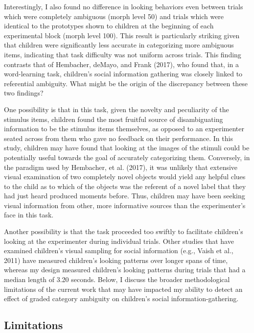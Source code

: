 \documentclass[floatsintext,man]{apa6}
\theoremstyle{definition}
\theoremstyle{definition}
\theoremstyle{definition}
\theoremstyle{remark}
\begin{document}
Interestingly, I also found no difference in looking behaviors even
between trials which were completely ambiguous (morph level 50) and
trials which were identical to the prototypes shown to children at the
beginning of each experimental block (morph level 100). This result is
particularly striking given that children were significantly less
accurate in categorizing more ambiguous items, indicating that task
difficulty was not uniform across trials. This finding contrasts that of
Hembacher, deMayo, and Frank (2017), who found that, in a word-learning
task, children's social information gathering was closely linked to
referential ambiguity. What might be the origin of the discrepancy
between these two findings?

One possibility is that in this task, given the novelty and peculiarity
of the stimulus items, children found the most fruitful source of
disambiguating information to be the stimulus items themselves, as
opposed to an experimenter seated across from them who gave no feedback
on their performance. In this study, children may have found that
looking at the images of the stimuli could be potentially useful towards
the goal of accurately categorizing them. Conversely, in the paradigm
used by Hembacher, et al. (2017), it was unlikely that extensive visual
examination of two completely novel objects would yield any helpful
clues to the child as to which of the objects was the referent of a
novel label that they had just heard produced moments before. Thus,
children may have been seeking visual information from other, more
informative sources than the experimenter's face in this task.

Another possibility is that the task proceeded too swiftly to facilitate
children's looking at the experimenter during individual trials. Other
studies that have examined children's visual sampling for social
information (e.g., Vaish et al., 2011) have measured children's looking
patterns over longer spans of time, whereas my design measured
children's looking patterns during trials that had a median length of
3.20 seconds. Below, I discuss the broader methodological limitations of
the current work that may have impacted my ability to detect an effect
of graded category ambiguity on children's social information-gathering.

\subsection{Limitations}\label{limitations}
\end{document}
